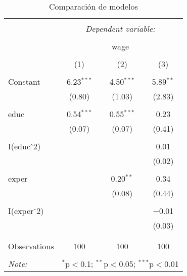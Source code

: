 \documentclass[12pt,a4paper]{article}
\begin{document}
\begin{table}[!htbp] \centering 
	\caption{Comparación de modelos} 
	\label{} 
	\begin{tabular}{@{\extracolsep{5pt}}lccc} 
		\\[-1.8ex]\hline 
		\hline \\[-1.8ex] 
		& \multicolumn{3}{c}{\textit{Dependent variable:}} \\ 
		\cline{2-4} 
		\\[-1.8ex] & \multicolumn{3}{c}{wage} \\ 
		\\[-1.8ex] & (1) & (2) & (3)\\ 
		\hline \\[-1.8ex] 
		Constant & 6.23$^{***}$ & 4.50$^{***}$ & 5.89$^{**}$ \\ 
		& (0.80) & (1.03) & (2.83) \\ 
		& & & \\ 
		educ & 0.54$^{***}$ & 0.55$^{***}$ & 0.23 \\ 
		& (0.07) & (0.07) & (0.41) \\ 
		& & & \\ 
		I(educ$\hat{\mkern6mu}$2) &  &  & 0.01 \\ 
		&  &  & (0.02) \\ 
		& & & \\ 
		exper &  & 0.20$^{**}$ & 0.34 \\ 
		&  & (0.08) & (0.44) \\ 
		& & & \\ 
		I(exper$\hat{\mkern6mu}$2) &  &  & $-$0.01 \\ 
		&  &  & (0.03) \\ 
		& & & \\ 
		\hline \\[-1.8ex] 
		Observations & 100 & 100 & 100 \\ 
		\hline 
		\hline \\[-1.8ex] 
		\textit{Note:}  & \multicolumn{3}{r}{$^{*}$p$<$0.1; $^{**}$p$<$0.05; $^{***}$p$<$0.01} \\ 
	\end{tabular} 
\end{table} 

\newpage

     
\end{document}

